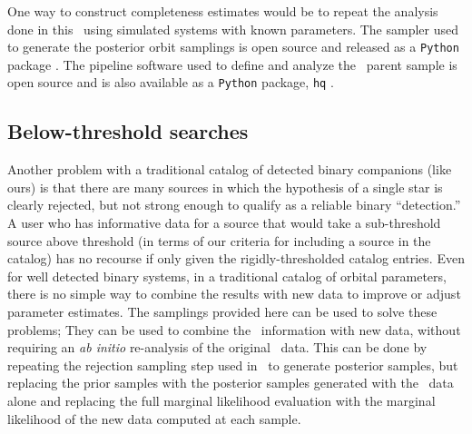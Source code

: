 \documentclass[modern]{aastex63}
\begin{document}
One way to construct completeness estimates would be to repeat the analysis done
in this \documentname\ using simulated systems with known parameters.
The sampler used to generate the posterior orbit samplings is open source and
released as a \texttt{Python} package \citep{thejoker, Price-Whelan:2019a}.
The pipeline software used to define and analyze the \apogee\ parent sample is
open source and is also available as a \texttt{Python} package, \texttt{hq}
\citep{Price-Whelan:2019}.



\subsection{Below-threshold searches}
\label{sec:subthreshold}

Another problem with a traditional catalog of detected binary companions (like
ours) is that there are many sources in which the hypothesis of a single star is
clearly rejected, but not strong enough to qualify as a reliable binary
``detection.''
A user who has informative data for a source that would take a sub-threshold
source above threshold (in terms of our criteria for including a source in the
catalog) has no recourse if only given the rigidly-thresholded catalog entries.
Even for well detected binary systems, in a traditional catalog of orbital
parameters, there is no simple way to combine the results with new data to
improve or adjust parameter estimates.
The samplings provided here can be used to solve these problems; They can be
used to combine the \apogee\ information with new data, without requiring an
\textsl{ab initio} re-analysis of the original \apogee\ data.
This can be done by repeating the rejection sampling step used in \thejoker\ to
generate posterior samples, but replacing the prior samples with the posterior
samples generated with the \apogee\ data alone and replacing the full marginal
likelihood evaluation with the marginal likelihood of the new data computed at
each sample.
\end{document}
